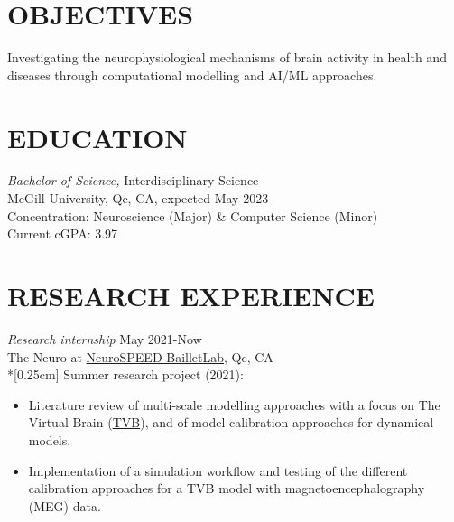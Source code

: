 \documentclass[margin, 10pt]{res} %
\begin{document}
\begin{resume}

 
\section{OBJECTIVES}  

Investigating the neurophysiological mechanisms of brain activity in health and diseases through computational modelling and AI/ML approaches.


\section{EDUCATION}

{\sl Bachelor of Science,} Interdisciplinary Science \\
McGill University, Qc, CA, expected May 2023 \\
Concentration: Neuroscience (Major) \& Computer Science (Minor) 
\\Current cGPA: 3.97

 
\section{RESEARCH EXPERIENCE}

{\sl Research internship} \hfill May 2021-Now\\The Neuro at \href{https://www.neurospeed-bailletlab.org/}{NeuroSPEED-BailletLab}, Qc, CA\\*[0.25cm] 
%
Summer research project (2021):
\vspace*{0.15cm}
\begin{itemize} \itemsep -2pt %
\item Literature review of multi-scale modelling approaches with a focus on The Virtual Brain (\href{https://www.thevirtualbrain.org/tvb/zwei}{TVB}), and of model calibration approaches for dynamical models.
\item Implementation of a simulation workflow and testing of the different calibration approaches for a TVB model with magnetoencephalography (MEG) data.
\end{itemize}
\vspace{-0.10cm}


\end{resume}
\end{document}
